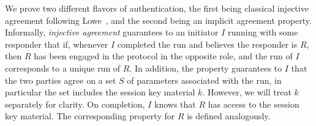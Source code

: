 \label{sec:authenticationDef}
We prove two different flavors of authentication, the first being classical
injective agreement following Lowe~\cite{DBLP:conf/csfw/Lowe97a}, and the second
being an implicit agreement property.
%
Informally, \emph{injective agreement} guarantees to an initiator $I$
running with some responder that if, whenever $I$ completed the run and
believes the responder is $R$,
then $R$ has been engaged in the protocol in the opposite role,
and the run of $I$ corresponds to a unique run of $R$.
%
In addition, the property guarantees to $I$ that the two parties agree on a set
$S$ of parameters associated with the run, in particular the set includes the
session key material $k$.
%
However, we will treat $k$ separately for clarity.
%
On completion, $I$ knows that $R$ has access to the session key material.
%
The corresponding property for $R$ is defined analogously.
%

